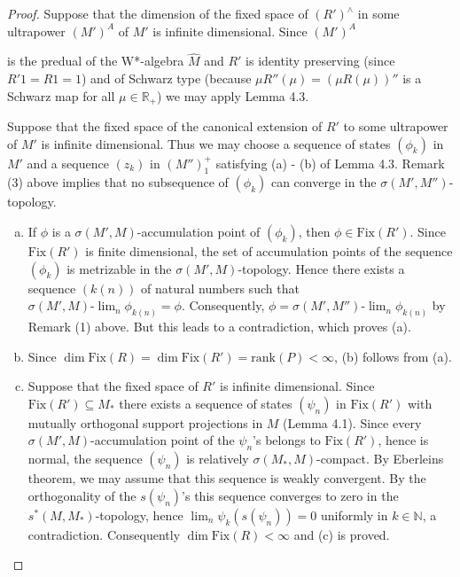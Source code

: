 \begin{proof}
Suppose that the dimension of the fixed space of \((R')^{\wedge}\) in some ultrapower \((M')^{A}\) of \(M'\) is infinite dimensional.
Since \((M')^{A}\)

\newpage

is the predual of the W*-algebra \(\hat{M}\) and \(R'\) is identity preserving (since \(R'1 = R1 = 1\)) and of Schwarz type (because \(\mu R''(\mu) = (\mu R(\mu))''\) is a Schwarz map for all \(\mu \in \mathbb{R}_{+}\)) we may apply Lemma 4.3.

Suppose that the fixed space of the canonical extension of \(R'\) to some ultrapower of \(M'\) is infinite dimensional.
Thus we may choose a sequence of states \((\phi_{k})\) in \(M'\) and a sequence \((z_{k})\) in \((M'')_{1}^{+}\) satisfying (a) - (b) of Lemma 4.3.
Remark (3) above implies that no subsequence of \((\phi_{k})\) can converge in the \(\sigma(M',M'')\)-topology.

\begin{enumerate}[(a)]
\item
If \(\phi\) is a \(\sigma(M',M)\)-accumulation point of \((\phi_{k})\), then \(\phi \in \text{Fix}(R')\).
Since \(\text{Fix}(R')\) is finite dimensional, the set of accumulation points of the sequence \((\phi_{k})\) is metrizable in the \(\sigma(M',M)\)-topology.
Hence there exists a sequence \((k(n))\) of natural numbers such that \(\sigma(M',M)\text{-}\lim_{n} \phi_{k(n)} = \phi\).
Consequently, \(\phi = \sigma(M',M'')\text{-}\lim_{n} \phi_{k(n)}\) by Remark (1) above.
But this leads to a contradiction, which proves (a).

\item
Since \(\dim \text{Fix}(R) = \dim \text{Fix}(R') = \text{rank}(P) < \infty\), (b) follows from (a).

\item
Suppose that the fixed space of \(R'\) is infinite dimensional.
Since \(\text{Fix}(R') \subseteq M_{*}\) there exists a sequence of states \((\psi_{n})\) in \(\text{Fix}(R')\) with mutually orthogonal support projections in \(M\) (Lemma 4.1).
Since every \(\sigma(M',M)\)-accumulation point of the \(\psi_{n}\)'s belongs to \(\text{Fix}(R')\), hence is normal, the sequence \((\psi_{n})\) is relatively \(\sigma(M_{*},M)\)-compact.
By Eberleins theorem, we may assume that this sequence is weakly convergent.
By the orthogonality of the \(s(\psi_{n})\)'s this sequence converges to zero in the \(s^{*}(M,M_{*})\)-topology, hence \(\lim_{n} \psi_{k}(s(\psi_{n})) = 0\) uniformly in \(k \in \mathbb{N}\), a contradiction.
Consequently \(\dim \text{Fix}(R) < \infty\) and (c) is proved.


\end{enumerate}
\end{proof}
